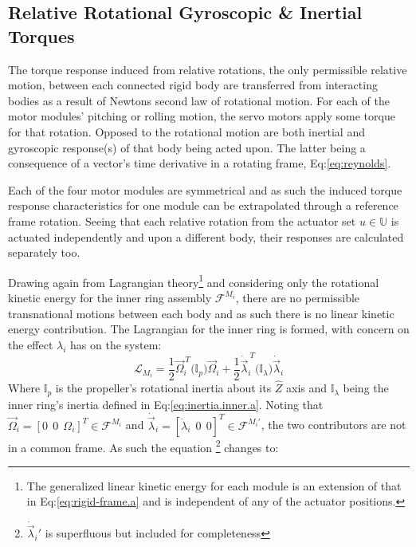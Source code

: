 \subsection{Relative Rotational Gyroscopic \& Inertial Torques}
\label{subsec:dynamics.nonlinearities.gyrotorques}
The torque response induced from relative rotations, the only permissible relative motion, between each connected rigid body are transferred from interacting bodies as a result of Newtons second law of rotational motion. For each of the motor modules' pitching or rolling motion, the servo motors apply some torque for that rotation. Opposed to the rotational motion are both inertial and gyroscopic response(s) of that body being acted upon. The latter being a consequence of a vector's time derivative in a rotating frame, Eq:\ref{eq:reynolds}.
\par
Each of the four motor modules are symmetrical and as such the induced torque response characteristics for one module can be extrapolated through a reference frame rotation. Seeing that each relative rotation from the actuator set $u\in\mathbb{U}$ is actuated independently and upon a different body, their responses are calculated separately too.
\par
Drawing again from Lagrangian theory\footnote{The generalized linear kinetic energy for each module is an extension of that in Eq:\ref{eq:rigid-frame.a} and is independent of any of the actuator positions.} and considering only the rotational kinetic energy for the inner ring assembly $\mathcal{F}^{M_i}$, there are no permissible transnational motions between each body and as such there is no linear kinetic energy contribution. The Lagrangian for the inner ring is formed, with concern on the effect $\lambda_i$ has on the system:
\begin{equation}
\mathcal{L}_{M_i}=\frac{1}{2}\vec{\Omega}_i^{~T}\big(\mathbb{I}_{p}\big)\vec{\Omega}_i+\frac{1}{2}\dot{\vec{\lambda}}_i^{~T}\big(\mathbb{I}_{\lambda}\big)\dot{\vec{\lambda}}_i
\end{equation}
Where $\mathbb{I}_p$ is the propeller's rotational inertia about its $\hat{Z}$ axis and $\mathbb{I}_\lambda$ being the inner ring's inertia defined in Eq:\ref{eq:inertia.inner.a}. Noting that $\vec{\Omega}_i=[0~~0~~\Omega_i]^T\in\mathcal{F}^{M_i}$ and $\dot{\vec{\lambda}}_i=[\dot{\lambda}_i~~0~~0]^T\in\mathcal{F}^{M_i'}$, the two contributors are not in a common frame. As such the equation \footnote{$\dot{\vec{\lambda}}_i'$ is superfluous but included for completeness} changes to:
